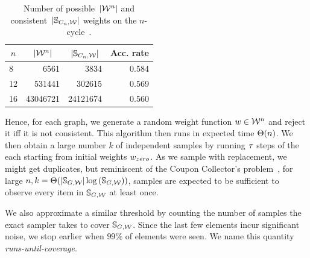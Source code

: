 \begin{table}[h!]
    \begin{center}
        \begin{tabular}{l|r|r|r}
            \multicolumn{1}{c|}{$n$} & \multicolumn{1}{c|}{$|\mathcal W^n|$} & \multicolumn{1}{c|}{$|\mathbb S_{C_n, \mathcal W}|$} & \multicolumn{1}{c}{Acc. rate} \\\hline
            8                        & \num{6561}                       & \num{3834}                                     & \num{0.584}                   \\
            12                       & \num{531441}                     & \num{302615}                                   & \num{0.569}                   \\
            16                       & \num{43046721}                   & \num{24121674}                                 & \num{0.560}                   \\
        \end{tabular}
    \end{center}
    \caption{Number of possible~$|\mathcal W^n|$ and consistent~$|\mathbb S_{C_n, \mathcal W}|$ weights on the $n$-cycle~\cite{RNEW}.}
    \label{tab:ncycle_acceptance}
\end{table}

Hence, for each graph, we generate a random weight function $w \in \mathcal W^n$ and reject it iff it is not consistent.
This algorithm then runs in expected time $\Theta\!\left(n\right)$.
We then obtain a large number $k$ of independent samples by running $\tau$ steps of the \markov each starting from initial weights $w_{zero}$.
As we sample with replacement, we might get duplicates, but reminiscent of the Coupon Collector's problem~\cite{CouponCollector}, for large $n, k = \Theta\!\left(|\mathbb{S}_{G, \mathcal W}|\log\left(\mathbb{S}_{G, \mathcal W}\right)\right)$, samples are expected to be sufficient to observe every item in $\mathbb{S}_{G, \mathcal W}$ at least once.

We also approximate a similar threshold by counting the number of samples the exact sampler takes to cover $\mathbb{S}_{G, \mathcal W}$.
Since the last few elements incur significant noise, we stop earlier when $99\%$ of elements were seen.
We name this quantity \emph{runs-until-coverage}.

